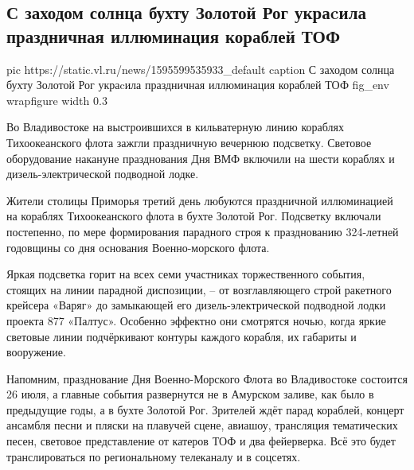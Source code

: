  
 
 
 
 
 
\subsection{С заходом солнца бухту Золотой Рог украcила праздничная иллюминация кораблей ТОФ}
\label{sec:25_07_2020.news.ru.vladivostok.1.zolotoi_rog}


\ifcmt
  pic https://static.vl.ru/news/1595599535933_default
  caption С заходом солнца бухту Золотой Рог украcила праздничная иллюминация кораблей ТОФ
	fig_env wrapfigure
	width 0.3
\fi

Во Владивостоке на выстроившихся в кильватерную линию кораблях Тихоокеанского
флота зажгли праздничную вечернюю подсветку. Световое оборудование накануне
празднования Дня ВМФ включили на шести кораблях и дизель-электрической
подводной лодке.

Жители столицы Приморья третий день любуются праздничной иллюминацией на
кораблях Тихоокеанского флота в бухте Золотой Рог. Подсветку включали
постепенно, по мере формирования парадного строя к празднованию 324-летней
годовщины со дня основания Военно-морского флота.

Яркая подсветка горит на всех семи участниках торжественного события, стоящих
на линии парадной диспозиции, – от возглавляющего строй ракетного крейсера
«Варяг» до замыкающей его дизель-электрической подводной лодки проекта 877
«Палтус». Особенно эффектно они смотрятся ночью, когда яркие световые линии
подчёркивают контуры каждого корабля, их габариты и вооружение.

Напомним, празднование Дня Военно-Морского Флота во Владивостоке состоится 26
июля, а главные события развернутся не в Амурском заливе, как было в предыдущие
годы, а в бухте Золотой Рог. Зрителей ждёт парад кораблей, концерт ансамбля
песни и пляски на плавучей сцене, авиашоу, трансляция тематических песен,
световое представление от катеров ТОФ и два фейерверка. Всё это будет
транслироваться по региональному телеканалу и в соцсетях.

